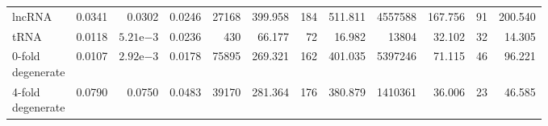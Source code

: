 \begin{table}
\begin{tabular}{lrrrrrrrrrrr}
        lncRNA                             & 0.0341 & 0.0302               & 0.0246 & \num{27168} & 399.958        & 184         & 511.811        & \num{4557588}  & 167.756        & 91         & 200.540 \\
        tRNA                               & 0.0118 & $5.21\mathrm{e}{-3}$ & 0.0236 & \num{430}   & 66.177         & 72          & 16.982         & \num{13804}    & 32.102         & 32         & 14.305 \\
        \shortstack[l]{0-fold\\degenerate} & 0.0107 & $2.92\mathrm{e}{-3}$ & 0.0178 & \num{75895} & 269.321        & 162         & 401.035        & \num{5397246}  & 71.115         & 46         & 96.221 \\
        \shortstack[l]{4-fold\\degenerate} & 0.0790 & 0.0750               & 0.0483 & \num{39170} & 281.364        & 176         & 380.879        & \num{1410361}  & 36.006         & 23         & 46.585 \\
    \bottomrule
    \end{tabular}
\end{table}

